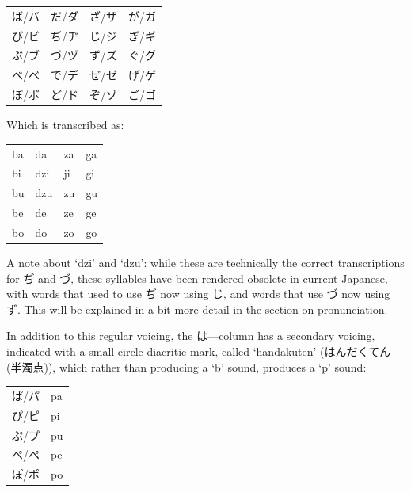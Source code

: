 \documentclass[11pt, b5paper, twoside, openright, onecolumn]{book}
\makeatletter
\newcommand*{\rubystack}[2]{{\relscale{0.5}%
  \begin{tabular}[b]{@{}c@{}}%
    {#1}\\%
   {\textscale{2}{#2}}%
  \end{tabular}}%
}
\DeclareRobustCommand*{\ruby}[2]{%
  \mbox{%
    \setlength{\parskip}{0ex}%
    \BeginAccSupp{method=pdfstringdef,ActualText={#1}}%
      \rubystack{\phantom{#2}}{#1}%
      \llap{%
        \rubystack{#2}{\phantom{#1}}%
      }%
    \EndAccSupp{}%
  }%
}
\renewcommand*{\ruby}[2]{#2 (#1)}%
\newenvironment{mytabular}[1]{\noindent\hspace{0.4in}
\begin{tabular}[h]{#1}}{\end{tabular}}
\makeatother
\begin{document}
\vspace{0.5cm}
\smaller
\begin{mytabular}{| l  l  l  l |}\hline 
\rule{0pt}{2.4ex}ば/バ & だ/ダ & ざ/ザ & が/ガ\\ 
\rule{0pt}{2.4ex}び/ビ & ぢ/ヂ & じ/ジ & ぎ/ギ\\ 
\rule{0pt}{2.4ex}ぶ/ブ & づ/ヅ & ず/ズ & ぐ/グ\\ 
\rule{0pt}{2.4ex}べ/ベ & で/デ & ぜ/ゼ & げ/ゲ\\ 
\rule{0pt}{2.4ex}ぼ/ボ & ど/ド & ぞ/ゾ & ご/ゴ\\ 
\hline 
\end{mytabular}
\larger
\vspace{0.5cm}


Which is transcribed as:

\vspace{0.5cm}
\smaller
\begin{mytabular}{| l  l  l  l |}\hline 
\rule{0pt}{2.4ex}ba & da & za & ga\\ 
\rule{0pt}{2.4ex}bi & dzi & ji & gi\\ 
\rule{0pt}{2.4ex}bu & dzu & zu & gu\\ 
\rule{0pt}{2.4ex}be & de & ze & ge\\ 
\rule{0pt}{2.4ex}bo & do & zo & go\\ 
\hline 
\end{mytabular}
\larger
\vspace{0.5cm}


A note about ‘dzi’ and ‘dzu’: while these are technically the correct transcriptions for ぢ and づ‚ these syllables have been rendered obsolete in current Japanese‚ with words that used to use ぢ now using じ‚ and words that use づ now using ず. This will be explained in a bit more detail in the section on pronunciation.

In addition to this regular voicing‚ the は—column has a secondary voicing‚ indicated with a small circle diacritic mark‚ called ‘handakuten’ (\ruby{半濁点}{はんだくてん})‚ which rather than producing a ‘b’ sound‚ produces a ‘p’ sound:

\vspace{0.5cm}
\smaller
\begin{mytabular}{| l  l |}\hline 
\rule{0pt}{2.4ex}ぱ/パ & pa\\ 
\rule{0pt}{2.4ex}ぴ/ピ & pi\\ 
\rule{0pt}{2.4ex}ぷ/プ & pu\\ 
\rule{0pt}{2.4ex}ぺ/ペ & pe\\ 
\rule{0pt}{2.4ex}ぽ/ポ & po\\ 
\hline 
\end{mytabular}
\larger
\end{document}
